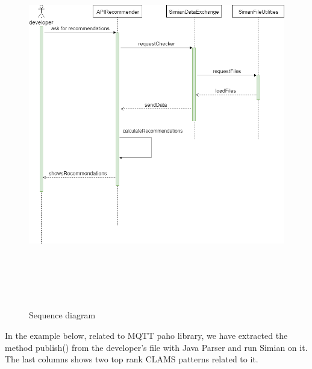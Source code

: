 \begin{figure}[H]
\includegraphics[width=14cm,height=16cm,keepaspectratio]{images/Sequence.png}
\centering
\caption{Sequence diagram }
\label{fig:cmd}
\end{figure}


In the example below, related to MQTT paho library, we have extracted the method publish() from the developer's file with Java Parser and run Simian on it.  The last columns shows two top rank CLAMS patterns related to it.
\vspace{5mm}

